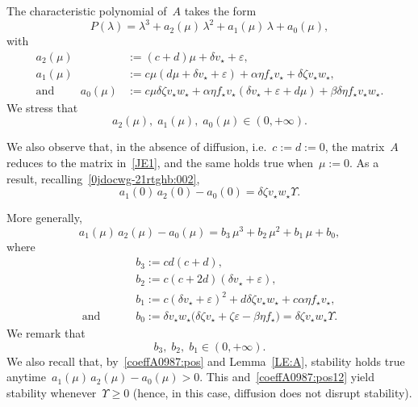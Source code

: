 \documentclass[12pt]{amsart}
\renewcommand{\epsilon}{\varepsilon}
\numberwithin{equation}{section}
\renewcommand{\ge}{\geqslant}
\begin{document}
The characteristic polynomial of~$A$ takes the form
\begin{equation}\label{coeffA0987:CPSD} P(\lambda)=\lambda^3+ a_2(\mu)\,\lambda^2+a_1(\mu)\,\lambda+a_0(\mu),\end{equation}
with
\begin{equation}\label{coeffA0987}\begin{split}
a_2(\mu)&:= (c+d)\mu + \delta v_\star + \epsilon , \\
a_1(\mu) &:=c\mu(d\mu+\delta v_\star + \epsilon ) + \alpha\eta f_\star v_\star + \delta\zeta v_\star  w_\star, \\
{\mbox{and }}\qquad
a_0 (\mu)&:=c\mu \delta\zeta v_\star w_\star + \alpha \eta f_\star v_\star (\delta v_\star + \epsilon + d\mu) + \beta\delta \eta
f_\star  v_\star w_\star.
\end{split}\end{equation}
We stress that
\begin{equation}\label{coeffA0987:pos}
a_2(\mu),\;a_1(\mu),\;a_0(\mu)\in(0,+\infty).
\end{equation}

We also observe that, in the absence of diffusion,
i.e.~$c:=d:=0$, the matrix~$A$ reduces to the matrix in~\eqref{JE1}, and the same holds true when~$\mu:=0$.
As a result, recalling~\eqref{0jdocwg-21rtghb:002},
\begin{equation*}
a_1(0)\, a_2(0)-a_0(0)=\delta\zeta v_\star w_\star\Upsilon.\end{equation*}

More generally,
\begin{equation}\label{bcoff6479832iPRE}
a_1(\mu)\, a_2(\mu) - a_0(\mu)= b_3\,\mu^3
+ b_2\,\mu^2 + b_1\,\mu +b_0,
\end{equation}
where
\begin{equation}\label{bcoff6479832i}\begin{split}&
b_3:=cd(c+d),\\&
b_2:=c(c+2d)(\delta v_\star + \epsilon),\\& 
b_1:=c(\delta v_\star + \epsilon)^2 + d\delta\zeta v_\star w_\star + c\alpha\eta f_\star v_\star ,\\
{\mbox{and }}\qquad&
b_0:=\delta v_\star w_\star
\big( \delta\zeta v_\star + \zeta\epsilon - \beta\eta f_\star \big)=
\delta\zeta v_\star w_\star\Upsilon.\end{split}
\end{equation}
We remark that
\begin{equation}\label{coeffA0987:pos12}
b_3,\;b_2,\;b_1\in(0,+\infty).
\end{equation}
We also recall that, by~\eqref{coeffA0987:pos} and Lemma~\ref{LE:A}, stability holds true anytime~$a_1(\mu)\, a_2(\mu) - a_0(\mu)>0$. This and~\eqref{coeffA0987:pos12} yield stability
whenever~$\Upsilon\ge0$ (hence, in this case, diffusion does not disrupt stability).
\end{document}
